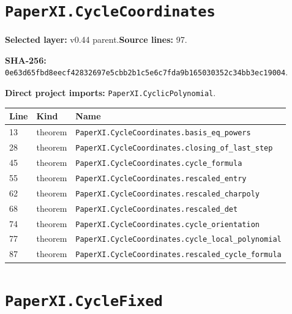 \documentclass[10pt,oneside]{book}
\begin{document}
\section{\texorpdfstring{\nolinkurl{PaperXI.CycleCoordinates}}{PaperXI.CycleCoordinates}}\label{module:PaperXI.CycleCoordinates}

\textbf{Selected layer:} v0.44 parent.\quad\textbf{Source lines:} 97.\par\textbf{SHA-256:} {\scriptsize\nolinkurl{0e63d65fbd8eecf42832697e5cbb2b1c5e6c7fda9b165030352c34bb3ec19004}}.


\textbf{Direct project imports:} \nolinkurl{PaperXI.CyclicPolynomial}.

\begin{longtable}{@{}p{}p{}p{}@{}}\toprule Line&Kind&Name\\\midrule\endhead

13&theorem&\nolinkurl{PaperXI.CycleCoordinates.basis_eq_powers}\\

28&theorem&\nolinkurl{PaperXI.CycleCoordinates.closing_of_last_step}\\

45&theorem&\nolinkurl{PaperXI.CycleCoordinates.cycle_formula}\\

55&theorem&\nolinkurl{PaperXI.CycleCoordinates.rescaled_entry}\\

62&theorem&\nolinkurl{PaperXI.CycleCoordinates.rescaled_charpoly}\\

68&theorem&\nolinkurl{PaperXI.CycleCoordinates.rescaled_det}\\

74&theorem&\nolinkurl{PaperXI.CycleCoordinates.cycle_orientation}\\

77&theorem&\nolinkurl{PaperXI.CycleCoordinates.cycle_local_polynomial}\\

87&theorem&\nolinkurl{PaperXI.CycleCoordinates.rescaled_cycle_formula}\\

\bottomrule\end{longtable}

\section{\texorpdfstring{\nolinkurl{PaperXI.CycleFixed}}{PaperXI.CycleFixed}}\label{module:PaperXI.CycleFixed}
\end{document}
